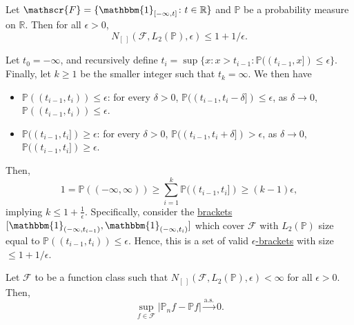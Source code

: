 \begin{eg}
	Let \(\mathscr{F} = \{ \mathbbm{1}_{[-\infty , t]} \colon t \in \mathbb{R}  \} \) and \(\mathbb{P} \) be a probability measure on \(\mathbb{R} \). Then for all \(\epsilon > 0\),
	\[
		N_{[\ ]}(\mathscr{F} , L_2(\mathbb{P} ) , \epsilon ) \leq 1 + 1 / \epsilon.
	\]
\end{eg}
\begin{explanation}
	Let \(t_0 = -\infty \), and recursively define \(t_i = \sup \{x\colon x> t_{i-1} \colon \mathbb{P}((t_{i-1}, x]) \leq \epsilon \} \). Finally, let \(k \geq 1\) be the smaller integer such that \(t_k = \infty \). We then have
	\begin{itemize}
		\item \(\mathbb{P} ((t_{i-1} , t_i))\leq \epsilon \): for every \(\delta > 0\), \(\mathbb{P} ((t_{i-1}, t_i - \delta ]) \leq \epsilon \), as \(\delta \to 0\), \(\mathbb{P} ((t_{i-1} , t_i)) \leq \epsilon \).
		\item \(\mathbb{P} ((t_{i-1}, t_i]) \geq \epsilon \): for every \(\delta > 0\), \(\mathbb{P} ((t_{i-1}, t_i + \delta ]) > \epsilon \), as \(\delta \to 0\), \(\mathbb{P} ((t_{i-1}, t_i]) \geq \epsilon \).
	\end{itemize}
	Then,
	\[
		1
		= \mathbb{P} ((-\infty , \infty ))
		\geq \sum_{i=1}^{k} \mathbb{P} ((t_{i-1}, t_i])
		\geq (k-1) \epsilon,
	\]
	implying \(k \leq 1 + \frac{1}{\epsilon }\). Specifically, consider the \hyperref[def:eps-bracket]{brackets} \([\mathbbm{1}_{(-\infty , t_{i-1})} , \mathbbm{1}_{(-\infty , t_i)} ]\) which cover \(\mathscr{F} \) with \(L_2(\mathbb{P} )\) size equal to \(\mathbb{P} ((t_{i-1} , t_i)) \leq \epsilon \). Hence, this is a set of valid \hyperref[def:eps-bracket]{\(\epsilon \)-brackets} with size \(\leq 1 + 1 / \epsilon \).
\end{explanation}
\begin{proposition}
	Let \(\mathscr{F} \) to be a function class such that \(N_{[\ ]}(\mathscr{F} , L_2(\mathbb{P} ), \epsilon ) < \infty \) for all \(\epsilon > 0\). Then,
	\[
		\sup _{f\in\mathscr{F} } \vert \mathbb{P} _n f - \mathbb{P} f \vert \overset{\text{a.s.} }{\to } 0.
	\]
\end{proposition}
